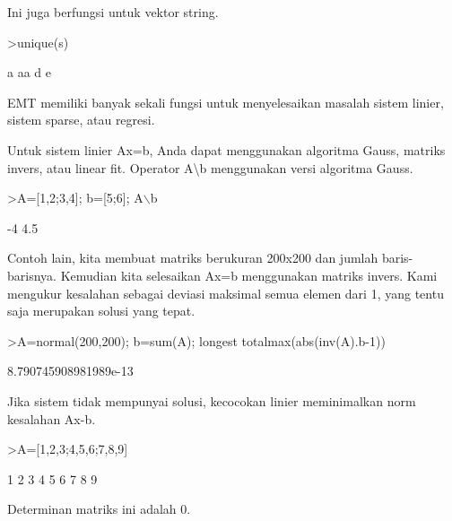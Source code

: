 \documentclass{article}
\begin{document}
\begin{eulernotebook}
\begin{eulercomment}
\begin{eulercomment}
\begin{eulercomment}
\begin{eulercomment}
\begin{eulercomment}
\begin{eulercomment}
\begin{eulercomment}
Ini juga berfungsi untuk vektor string.
\end{eulercomment}
\begin{eulerprompt}
>unique(s)
\end{eulerprompt}
\begin{euleroutput}
  a
  aa
  d
  e
\end{euleroutput}
\begin{eulercomment}
EMT memiliki banyak sekali fungsi untuk menyelesaikan masalah sistem
linier, sistem sparse, atau regresi.

Untuk sistem linier Ax=b, Anda dapat menggunakan algoritma Gauss,
matriks invers, atau linear fit. Operator A\textbackslash{}b menggunakan versi
algoritma Gauss.
\end{eulercomment}
\begin{eulerprompt}
>A=[1,2;3,4]; b=[5;6]; A\(\backslash\)b
\end{eulerprompt}
\begin{euleroutput}
             -4 
            4.5 
\end{euleroutput}
\begin{eulercomment}
Contoh lain, kita membuat matriks berukuran 200x200 dan jumlah
baris-barisnya. Kemudian kita selesaikan Ax=b menggunakan matriks
invers. Kami mengukur kesalahan sebagai deviasi maksimal semua elemen
dari 1, yang tentu saja merupakan solusi yang tepat.
\end{eulercomment}
\begin{eulerprompt}
>A=normal(200,200); b=sum(A); longest totalmax(abs(inv(A).b-1))
\end{eulerprompt}
\begin{euleroutput}
    8.790745908981989e-13 
\end{euleroutput}
\begin{eulercomment}
Jika sistem tidak mempunyai solusi, kecocokan linier meminimalkan norm
kesalahan Ax-b.
\end{eulercomment}
\begin{eulerprompt}
>A=[1,2,3;4,5,6;7,8,9]
\end{eulerprompt}
\begin{euleroutput}
              1             2             3 
              4             5             6 
              7             8             9 
\end{euleroutput}
\begin{eulercomment}
Determinan matriks ini adalah 0.
\end{eulercomment}
\begin{eulerprompt}

\end{eulerprompt}
\end{eulercomment}
\end{eulercomment}
\end{eulercomment}
\end{eulercomment}
\end{eulercomment}
\end{eulercomment}
\end{eulernotebook}
\end{document}
